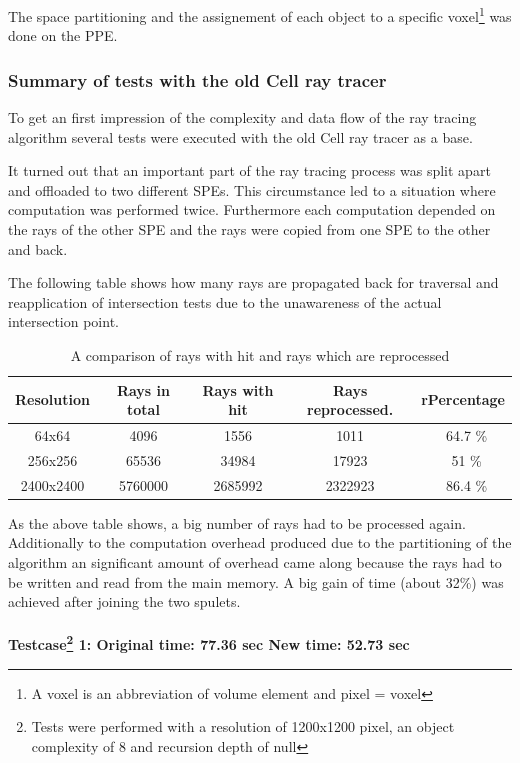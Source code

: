 \documentclass[DIV10, abstracton, openright, footsepline, headsepline, twoside, 9pt,
bigheadings]{scrreprt}
\begin{document}
The space partitioning and the assignement of each object to a specific
voxel\footnote{A voxel is an abbreviation of volume element and pixel = voxel}
was done on the PPE.

\subsubsection*{Summary of tests with the old Cell ray tracer}
To get an first impression of the complexity and data flow of the ray tracing
algorithm several tests were executed with the old Cell ray tracer as a base.


It turned out that an important part of the ray tracing process was split
apart and offloaded to two different SPEs. This circumstance led to a
situation where computation was performed twice. Furthermore each computation
depended on the rays of the other SPE and the rays were copied from one SPE
to the other and back.

The following table shows how many rays are propagated back for traversal and
reapplication of intersection tests due to the unawareness of the actual
intersection point.

\begin{table}[h]
\centering
\begin{tabular}{|c|c|c|c|c|}
\hline
\textbf{\textsf{{Resolution}}} &
\textbf{\textsf{\textbf{Rays in total}}} &
\textbf{\textsf{\textbf{Rays with hit}}} &
\textbf{\textsf{\textbf{Rays reprocessed.}}} &
\textbf{\textsf{r\textbf{Percentage}}}\\
\hline
64x64 & 4096 & 1556 & 1011 & ~64.7 \%\\ \hline
256x256 & 65536 & 34984 & 17923 & ~51 \%\\ \hline
2400x2400 & 5760000 & 2685992 & 2322923 & ~86.4 \% \\ \hline
\end{tabular}
\caption{A comparison of rays with hit and rays which are reprocessed}
\end{table}

As the above table shows, a big number of rays had to be processed again.
Additionally to the computation overhead produced due to the
partitioning of the algorithm an significant amount of
overhead came along because the rays had to be written and read from the main
memory. A big gain of time (about 32\%) was achieved after joining the two
spulets.\\\\
\textbf{Testcase\footnote{Tests were performed with a resolution of 1200x1200
pixel, an object complexity of 8 and recursion depth of null} 1: Original
time: 77.36 sec New time: 52.73 sec}\\
\end{document}
